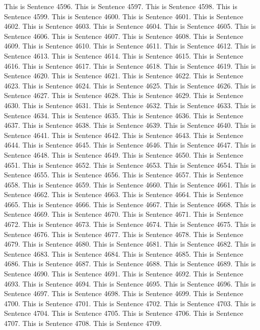 \documentclass{article}
\begin{document}
This is Sentence 4596.
This is Sentence 4597.
This is Sentence 4598.
This is Sentence 4599.
This is Sentence 4600.
This is Sentence 4601.
This is Sentence 4602.
This is Sentence 4603.
This is Sentence 4604.
This is Sentence 4605.
This is Sentence 4606.
This is Sentence 4607.
This is Sentence 4608.
This is Sentence 4609.
This is Sentence 4610.
This is Sentence 4611.
This is Sentence 4612.
This is Sentence 4613.
This is Sentence 4614.
This is Sentence 4615.
This is Sentence 4616.
This is Sentence 4617.
This is Sentence 4618.
This is Sentence 4619.
This is Sentence 4620.
This is Sentence 4621.
This is Sentence 4622.
This is Sentence 4623.
This is Sentence 4624.
This is Sentence 4625.
This is Sentence 4626.
This is Sentence 4627.
This is Sentence 4628.
This is Sentence 4629.
This is Sentence 4630.
This is Sentence 4631.
This is Sentence 4632.
This is Sentence 4633.
This is Sentence 4634.
This is Sentence 4635.
This is Sentence 4636.
This is Sentence 4637.
This is Sentence 4638.
This is Sentence 4639.
This is Sentence 4640.
This is Sentence 4641.
This is Sentence 4642.
This is Sentence 4643.
This is Sentence 4644.
This is Sentence 4645.
This is Sentence 4646.
This is Sentence 4647.
This is Sentence 4648.
This is Sentence 4649.
This is Sentence 4650.
This is Sentence 4651.
This is Sentence 4652.
This is Sentence 4653.
This is Sentence 4654.
This is Sentence 4655.
This is Sentence 4656.
This is Sentence 4657.
This is Sentence 4658.
This is Sentence 4659.
This is Sentence 4660.
This is Sentence 4661.
This is Sentence 4662.
This is Sentence 4663.
This is Sentence 4664.
This is Sentence 4665.
This is Sentence 4666.
This is Sentence 4667.
This is Sentence 4668.
This is Sentence 4669.
This is Sentence 4670.
This is Sentence 4671.
This is Sentence 4672.
This is Sentence 4673.
This is Sentence 4674.
This is Sentence 4675.
This is Sentence 4676.
This is Sentence 4677.
This is Sentence 4678.
This is Sentence 4679.
This is Sentence 4680.
This is Sentence 4681.
This is Sentence 4682.
This is Sentence 4683.
This is Sentence 4684.
This is Sentence 4685.
This is Sentence 4686.
This is Sentence 4687.
This is Sentence 4688.
This is Sentence 4689.
This is Sentence 4690.
This is Sentence 4691.
This is Sentence 4692.
This is Sentence 4693.
This is Sentence 4694.
This is Sentence 4695.
This is Sentence 4696.
This is Sentence 4697.
This is Sentence 4698.
This is Sentence 4699.
This is Sentence 4700.
This is Sentence 4701.
This is Sentence 4702.
This is Sentence 4703.
This is Sentence 4704.
This is Sentence 4705.
This is Sentence 4706.
This is Sentence 4707.
This is Sentence 4708.
This is Sentence 4709.
\end{document}
